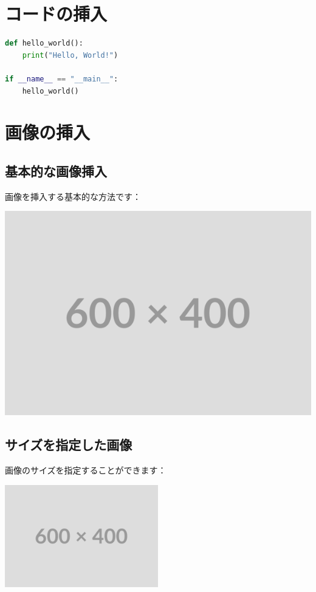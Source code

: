 \documentclass[12pt,a4paper,dvipdfmx]{jarticle}
\begin{document}
\section{コードの挿入}

\begin{lstlisting}[language=Python, caption=Pythonコード例]
def hello_world():
    print("Hello, World!")

if __name__ == "__main__":
    hello_world()
\end{lstlisting}

\section{画像の挿入}

\subsection{基本的な画像挿入}

画像を挿入する基本的な方法です：

\includegraphics{images/placeholder.png}

\subsection{サイズを指定した画像}

画像のサイズを指定することができます：

\includegraphics[width=0.5\textwidth]{images/placeholder.png}
\end{document}
